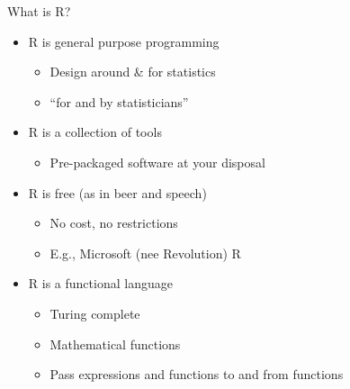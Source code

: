 \documentclass[
  ignorenonframetext,
]{beamer}
\providecommand{\tightlist}{%
  \setlength{\itemsep}{0pt}\setlength{\parskip}{0pt}}
\begin{document}
\begin{frame}{What is R?}
\protect\hypertarget{what-is-r}{}

\begin{itemize}
\tightlist
\item
  R is general purpose programming

  \begin{itemize}
  \tightlist
  \item
    Design around \& for statistics
  \item
    ``for and by statisticians''
  \end{itemize}
\item
  R is a collection of tools

  \begin{itemize}
  \tightlist
  \item
    Pre-packaged software at your disposal
  \end{itemize}
\item
  R is free (as in beer and speech)

  \begin{itemize}
  \tightlist
  \item
    No cost, no restrictions
  \item
    E.g., Microsoft (nee Revolution) R
  \end{itemize}
\item
  R is a functional language

  \begin{itemize}
  \tightlist
  \item
    Turing complete
  \item
    Mathematical functions
  \item
    Pass expressions and functions to and from functions
  \end{itemize}
\end{itemize}

\end{frame}
\end{document}
